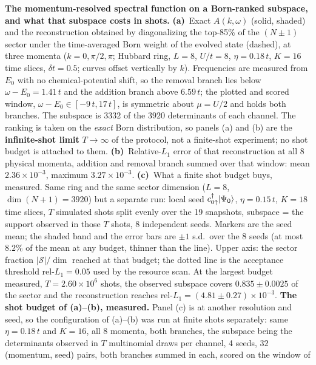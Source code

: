 \caption{\textbf{The momentum-resolved spectral function on a Born-ranked subspace, and what that
subspace costs in shots.}
\textbf{(a)}~Exact $A(k,\omega)$ (solid, shaded) and the reconstruction obtained by
diagonalizing the top-85\% of the $(N{\pm}1)$ sector under the time-averaged Born weight of the
evolved state (dashed), at three momenta ($k=0,\pi/2,\pi$; Hubbard ring, $L=8$, $U/t=8$,
$\eta=0.18\,t$, $K=16$ time slices, $\delta t=0.5$; curves offset vertically by $k$).
Frequencies are measured from $E_0$ with no chemical-potential shift, so the removal branch lies
below $\omega-E_0=1.41\,t$ and the addition branch above $6.59\,t$; the plotted and scored window,
$\omega-E_0\in[-9\,t,17\,t]$, is symmetric about $\mu=U/2$ and holds both branches.
The subspace is $3332$ of the $3920$ determinants of each channel. The ranking is
taken on the \emph{exact} Born distribution, so panels (a) and (b)
are the \textbf{infinite-shot limit} $T\rightarrow\infty$ of the protocol, not a finite-shot experiment;
no shot budget is attached to them.
\textbf{(b)}~Relative-$L_1$ error of that reconstruction at all 8 physical momenta, addition and
removal branch summed over that window: mean $2.36\times10^{-3}$, maximum $3.27\times10^{-3}$.
\textbf{(c)}~What a finite shot budget buys, measured. Same ring and the same sector dimension
($L=8$, $\dim(N{+}1)=3920$) but a separate run: local seed $c^{\dagger}_{0\uparrow}\ket{\Psi_0}$,
$\eta=0.15\,t$, $K=18$ time slices, $T$ simulated shots split evenly over the 19 snapshots, subspace
= the support observed in those $T$ shots, 8 independent seeds. Markers are the seed mean; the
shaded band and the error bars are $\pm1$ s.d.\ over the 8 seeds (at most $8.2\%$ of the
mean at any budget, thinner than the line). Upper axis: the sector fraction $|\mathcal S|/\dim$
reached at that budget; the dotted line is the acceptance threshold rel-$L_1=0.05$ used by the
resource scan. At the largest budget measured, $T=2.60\times10^{6}$ shots, the observed subspace covers
$0.835\pm0.0025$ of the sector and the reconstruction reaches
rel-$L_1=(4.81\pm0.27)\times10^{-3}$.
\textbf{The shot budget of (a)--(b), measured.} Panel (c) is at another resolution and seed, so the
configuration of (a)--(b) was run at finite shots separately: same $\eta=0.18\,t$ and $K=16$, all 8
momenta, both branches, the subspace being the determinants observed in $T$ multinomial draws per
channel, 4 seeds, $32$ (momentum, seed) pairs, both branches summed in each, scored on the window of
}
